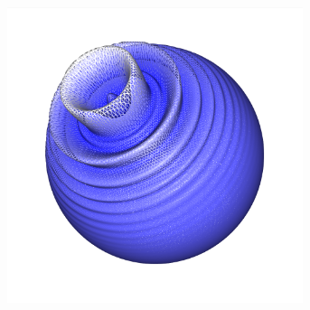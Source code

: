 \documentclass[crop=false]{standalone}
\begin{document}
\begin{figure}[h]
\begin{subfigure}[b]{0.24\textwidth}
        \caption{}
      \end{subfigure}
      \begin{subfigure}[b]{0.24\textwidth}
        \center
        \includegraphics[trim={2.12cm 2.33cm 2.2cm 0cm},clip,width=0.95\textwidth]{images/sphere_wave_3.png}
        \caption{}
      \end{subfigure}


\end{figure}
\end{document}
